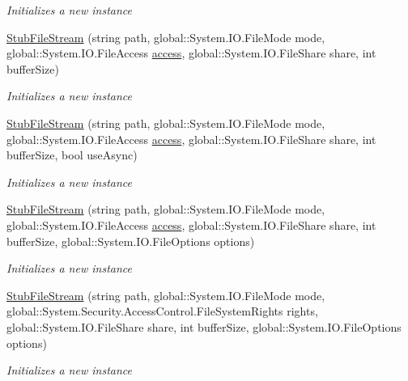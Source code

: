 \begin{DoxyCompactItemize}
\begin{DoxyCompactList}\small\item\em Initializes a new instance\end{DoxyCompactList}\item 
\hyperlink{class_system_1_1_i_o_1_1_fakes_1_1_stub_file_stream_a78fec1605f03efb6aee2cd956598c9ae}{Stub\-File\-Stream} (string path, global\-::\-System.\-I\-O.\-File\-Mode mode, global\-::\-System.\-I\-O.\-File\-Access \hyperlink{jquery-1_810_82-vsdoc_8js_a130ad18d21e14ee566dbf4eb185f2bda}{access}, global\-::\-System.\-I\-O.\-File\-Share share, int buffer\-Size)
\begin{DoxyCompactList}\small\item\em Initializes a new instance\end{DoxyCompactList}\item 
\hyperlink{class_system_1_1_i_o_1_1_fakes_1_1_stub_file_stream_af412c868c55795c8a0e046d68f94c4b8}{Stub\-File\-Stream} (string path, global\-::\-System.\-I\-O.\-File\-Mode mode, global\-::\-System.\-I\-O.\-File\-Access \hyperlink{jquery-1_810_82-vsdoc_8js_a130ad18d21e14ee566dbf4eb185f2bda}{access}, global\-::\-System.\-I\-O.\-File\-Share share, int buffer\-Size, bool use\-Async)
\begin{DoxyCompactList}\small\item\em Initializes a new instance\end{DoxyCompactList}\item 
\hyperlink{class_system_1_1_i_o_1_1_fakes_1_1_stub_file_stream_ad405bc2c831df8630a449cf1b19ae843}{Stub\-File\-Stream} (string path, global\-::\-System.\-I\-O.\-File\-Mode mode, global\-::\-System.\-I\-O.\-File\-Access \hyperlink{jquery-1_810_82-vsdoc_8js_a130ad18d21e14ee566dbf4eb185f2bda}{access}, global\-::\-System.\-I\-O.\-File\-Share share, int buffer\-Size, global\-::\-System.\-I\-O.\-File\-Options options)
\begin{DoxyCompactList}\small\item\em Initializes a new instance\end{DoxyCompactList}\item 
\hyperlink{class_system_1_1_i_o_1_1_fakes_1_1_stub_file_stream_a1267ad31398b3870378c97354c6b8667}{Stub\-File\-Stream} (string path, global\-::\-System.\-I\-O.\-File\-Mode mode, global\-::\-System.\-Security.\-Access\-Control.\-File\-System\-Rights rights, global\-::\-System.\-I\-O.\-File\-Share share, int buffer\-Size, global\-::\-System.\-I\-O.\-File\-Options options)
\begin{DoxyCompactList}\small\item\em Initializes a new instance\end{DoxyCompactList}\item 

\end{DoxyCompactItemize}
